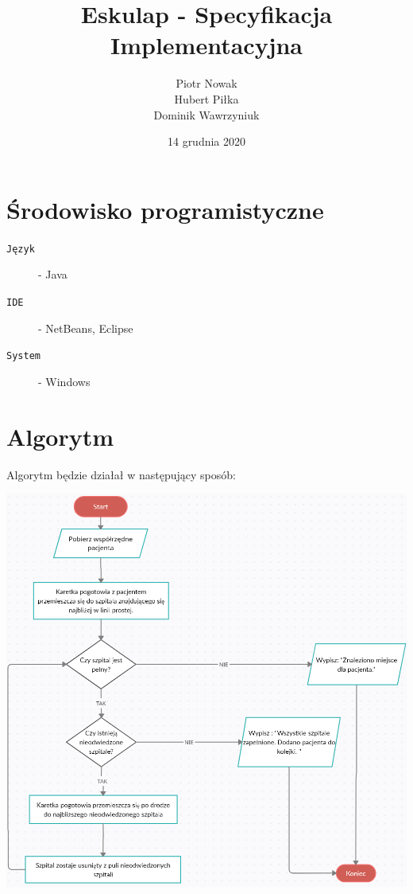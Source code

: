 \documentclass[a4paper,12pt,twoside]{article}
\title{Eskulap - Specyfikacja Implementacyjna}
\date{14 grudnia 2020}
\author{Piotr Nowak\\Hubert Piłka\\Dominik Wawrzyniuk}
\begin{document}
\maketitle
\thispagestyle{empty}
\newpage
\tableofcontents
\newpage
\section{Środowisko programistyczne}
\begin{description}
\item[\texttt {Język }] - Java
\item[\texttt {IDE }] - NetBeans, Eclipse
\item[\texttt {System }] - Windows
\end{description}
\section{Algorytm}
Algorytm będzie działał w następujący sposób:
\begin{center}
\includegraphics[scale=0.65]{schemat}
\end{center}
\end{document}
